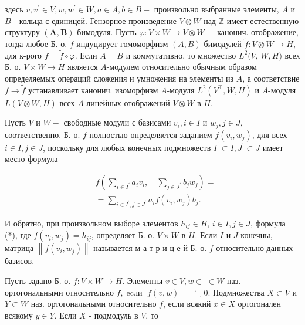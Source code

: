\documentclass[10pt]{article}
\begin{document}
здесь $v, v^{\prime} \in V, w, w^{\prime} \in W, a \in A, b \in B-$ произвольно выбранные элементы, $A$ и $B$ - кольца с единицей. Гензорное произведение $V \otimes W$ над $\mathbb{Z}$ имеет естественную структуру $(\boldsymbol{A}, \boldsymbol{B})$-бимодуля. Пусть $\varphi: V \times W \rightarrow V \otimes W-$ канонич. отображение, тогда любое Б. о. $f$ индуцирует гомоморфизм $(A, B)$-бимодулей $\tilde{f}: V \otimes W \rightarrow H$, для к-рого $f=\tilde{f} \circ \varphi$. Если $A=B$ и коммутативно, то множество $L^{2}(V$, $W, H)$ всех Б. о. $V \times W \rightarrow H$ является $A$-модулем относительно обычным образом определяемых операций сложения и умножения на элементы из $A$, а соответствие $f \rightarrow \tilde{f}$ устанавливает канонич. изоморфизм $A$-модуля $L^{2}\left(V^{\top}, W, H\right)$ и $A$-модуля $L(V \otimes W, H)$ всех $A$-линейных отображений $V \otimes W$ в $H$.



Пусть $V$ и $W-$ свободные модули с базисами $v_{i}, i \in I$ и $w_{j}, j \in J$, соответственно. Б. о. $f$ полностью определяется заданием $f\left(v_{i}, w_{j}\right)$, для всех $i \in I, j \in J$, поскольку для любых конечных подмножеств $I^{\prime} \subset I, J^{\prime} \subset J$ имеет место формула



\[

\begin{aligned}

& f\left(\sum_{i \in I^{\prime}} a_{i} v_{i}, \quad \sum_{j \in J^{\prime}} b_{j} w_{j}\right)= \\

& =\sum_{i \in I^{\prime}, j \in J^{\prime}} a_{i} f\left(v_{i}, w_{j}\right) b_{j} .

\end{aligned}

\]



И обратно, при произвольном выборе элементов $h_{i j} \in H$, $i \in I, j \in J$, формула (*), где $f\left(v_{i}, w_{j}\right)=h_{i j}$, определяет Б. о. $V \times W$ в $H$. Если $I$ и $J$ конечны, матрица $\left\|f\left(v_{i}, w_{j}\right)\right\|$ называется м а т р и ц е й Б. о. $f$ относительно данных базисов.



Пусть задано Б. о. $f: V \times W \rightarrow H$. Элементы $v \in V, w \in$ $\in W$ наз. ортогональными относительно $f, \operatorname{ecли~} f(v, w)=$ $\fallingdotseq 0$. Подмножества $X \subset V$ и $Y \subset W$ наз. ортогональными относительно $f$, если всякий $x \in X$ ортогонален всякому $y \in Y$. Если $X$ - подмодуль в $V$, то
\end{document}
